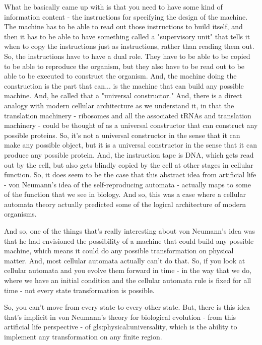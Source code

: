 \documentclass[]{article}
\begin{document}
What he basically came up with is that
you need to have some kind
of information content -
the instructions for specifying
the design of the machine.
The machine has to be able to read out
those instructions to build itself,
and then it has to be able to have
something called a "supervisory unit"
that tells it when to copy
the instructions
just as instructions,
rather than reading them out.
So, the instructions have to
have a dual role.
They have to be able to be copied
to be able to reproduce the organism,
but they also have to be read out
to be able to be executed
to construct the organism.
And, the machine doing the construction
is the part that can...
is the machine that can build
any possible machine.
And, he called that
a "universal constructor."
And, there is a direct analogy
with modern cellular architecture
as we understand it,
in that the translation machinery -
ribosomes and all the associated
tRNAs and translation machinery -
could be thought of
as a universal constructor
that can construct any possible proteins.
So, it's not a universal constructor
in the sense that it can make
any possible object,
but it is a universal constructor
in the sense
that it can produce any possible protein.
And, the instruction tape is DNA,
which gets read out by the cell,
but also gets blindly copied
by the cell at other stages
in cellular function.
So, it does seem to be the case
that this abstract idea
from artificial life -
von Neumann's idea of
the self-reproducing automata -
actually maps to some of the function
that we see in biology.
And so, this was a case where
a cellular automata theory
actually predicted some of the logical
architecture of modern organisms.

And so, one of the things that's really
interesting about von Neumann's idea
was that he had envisioned
the possibility of a machine
that could build any possible machine,
which means it could do any possible
transformation on physical matter.
And, most cellular automata
actually can't do that.
So, if you look at cellular automata
and you evolve them forward in time -
in the way that we do,
where we have an initial condition
and the cellular automata rule
is fixed for all time -
not every state transformation
is possible.

So, you can't move from every state
to every other state.
But, there is this idea
that's implicit in von Neumann's theory
for biological evolution -
from this artificial life perspective -
of \gls{gls:physical:universality},
which is the ability to implement
any transformation on any finite region.
\end{document}
